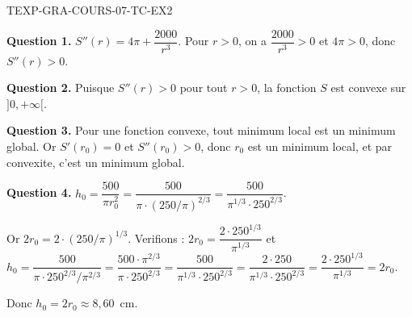 \begin{corrige}{TEXP-GRA-COURS-07-TC-EX2}

\textbf{Question 1.} $S''(r) = 4\pi + \dfrac{2000}{r^3}$. Pour $r > 0$, on a $\dfrac{2000}{r^3} > 0$ et $4\pi > 0$, donc $S''(r) > 0$.

\textbf{Question 2.} Puisque $S''(r) > 0$ pour tout $r > 0$, la fonction $S$ est convexe sur $]0, +\infty[$.

\textbf{Question 3.} Pour une fonction convexe, tout minimum local est un minimum global. Or $S'(r_0) = 0$ et $S''(r_0) > 0$, donc $r_0$ est un minimum local, et par convexite, c'est un minimum global.

\textbf{Question 4.} $h_0 = \dfrac{500}{\pi r_0^2} = \dfrac{500}{\pi \cdot (250/\pi)^{2/3}} = \dfrac{500}{\pi^{1/3} \cdot 250^{2/3}}$.

Or $2r_0 = 2 \cdot (250/\pi)^{1/3}$. Verifions : $2r_0 = \dfrac{2 \cdot 250^{1/3}}{\pi^{1/3}}$ et $h_0 = \dfrac{500}{\pi \cdot 250^{2/3}/\pi^{2/3}} = \dfrac{500 \cdot \pi^{2/3}}{\pi \cdot 250^{2/3}} = \dfrac{500}{\pi^{1/3} \cdot 250^{2/3}} = \dfrac{2 \cdot 250}{\pi^{1/3} \cdot 250^{2/3}} = \dfrac{2 \cdot 250^{1/3}}{\pi^{1/3}} = 2r_0$.

Donc $h_0 = 2r_0 \approx 8{,}60$~cm.

\end{corrige}
